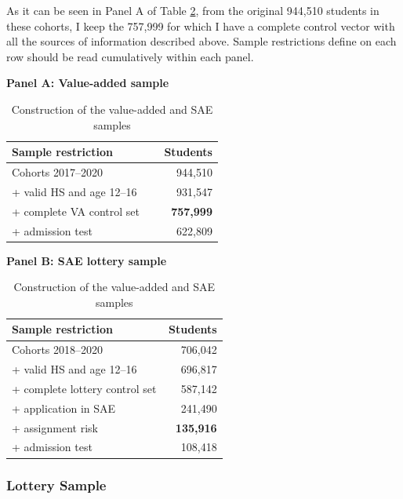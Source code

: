 \documentclass[a4paper, article, english, oneside, unknownkeysallowed, 12pt]{memoir}
\begin{document}
As it can be seen in Panel A of Table \ref{tab:data-samples}, from the original 944,510 students in these cohorts, 
I keep the 757,999 for which I have a complete control vector with all the sources of information described above. 
Sample restrictions define on each row should be read cumulatively within each panel.



\begin{table}[H]
\centering
\caption{Construction of the value-added and SAE samples}
\label{tab:data-samples}
\begin{minipage}[t]{0.48\textwidth}
\centering
\textbf{Panel A: Value-added sample}\\[0.4em]
\begin{tabular}{@{}p{0.72\linewidth}r@{}}
\toprule
Sample restriction & Students \\
\midrule
Cohorts 2017--2020 & 944,510 \\
+ valid HS and age 12--16 & 931,547 \\
+ complete VA control set & \textbf{757,999} \\
+ admission test & 622,809 \\
\bottomrule
\end{tabular}
\end{minipage}
\hfill
\begin{minipage}[t]{0.48\textwidth}
\centering
\textbf{Panel B: SAE lottery sample}\\[0.4em]
\begin{tabular}{@{}p{0.72\linewidth}r@{}}
\toprule
Sample restriction & Students \\
\midrule
Cohorts 2018--2020 & 706,042 \\
+ valid HS and age 12--16 & 696,817 \\
+ complete lottery control set & 587,142 \\
+ application in SAE & 241,490 \\
+ assignment risk & \textbf{135,916} \\
+ admission test & 108,418 \\
\bottomrule
\end{tabular}
\end{minipage}
\end{table}



\subsubsection{Lottery Sample}
\end{document}
